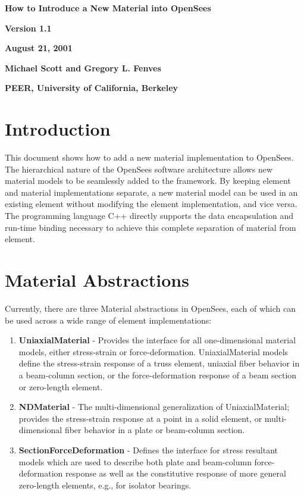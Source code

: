 \documentclass[12pt]{article}
\begin{document}


\begin{center}
{\bf \Large How to Introduce a New Material into OpenSees}

{\bf Version 1.1} 

{\bf August 21, 2001} 

{\bf Michael Scott and Gregory L. Fenves} 

{\bf PEER, University of California, Berkeley}
\end{center}

\section{Introduction}
This document shows how to add a new material implementation to OpenSees. The hierarchical
nature of the OpenSees software architecture allows new material models
to be seamlessly added to the framework. By keeping element and material implementations
separate, a new material model can be used in an existing element without modifying
the element implementation, and vice versa. The programming language C++ directly supports
the data encapsulation and run-time binding necessary to achieve this complete separation 
of material from element.

\section{Material Abstractions}
Currently, there are three Material abstractions in OpenSees, each of which can be used 
across a wide range of element implementations:

\begin{enumerate}
\item{\bf UniaxialMaterial} - Provides the interface for all one-dimensional material
models, either stress-strain or force-deformation.
UniaxialMaterial models define the stress-strain response of a truss element, uniaxial 
fiber behavior in a
beam-column section, or the force-deformation response of a beam section or
zero-length element.

\item{\bf NDMaterial} - The multi-dimensional generalization of UniaxialMaterial;
provides the stress-strain response at a point in a solid element, or multi-dimensional
fiber behavior in a plate or beam-column section.

\item{\bf SectionForceDeformation} - Defines the interface for stress resultant models
which are used to describe both plate and beam-column force-deformation response as well as
the constitutive response of more general zero-length elements, e.g., for isolator
bearings.
\end{enumerate}
\end{document}
